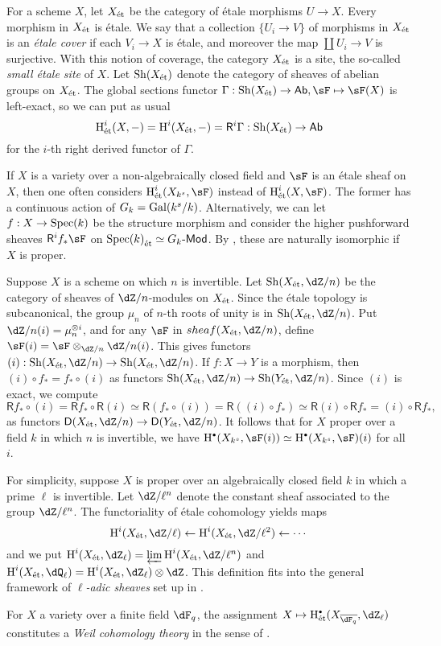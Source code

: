 \documentclass{article}
\begin{document}
For a scheme $X$, let ${X}_\textnormal{\'et}$ be the category of \'etale morphisms 
$U\to X$. Every morphism in ${X}_\textnormal{\'et}$ is \'etale. We say that a collection 
$\{U_i\to V\}$ of morphisms in ${X}_\textnormal{\'et}$ is an \emph{\'etale cover} if each 
$V_i \to X$ is \'etale, and moreover the map $\coprod U_i \to V$ is surjective. 
With this notion of coverage, the category ${X}_\textnormal{\'et}$ is a site, the so-called 
\emph{small \'etale site} of $X$. Let $\operatorname{Sh}({X}_\textnormal{\'et})$ denote the category of 
sheaves of abelian groups on ${X}_\textnormal{\'et}$. The global sections functor 
$\Gamma:\sheaf(\et X) \to \mathsf{Ab},\sF\mapsto \sF(X)$ is left-exact, so we 
can put as usual 
\[
  \operatorname{H}_\text{\'et}^i(X,-) = \operatorname{H}^i({X}_\textnormal{\'et},-) = \mathsf R^i \Gamma :\operatorname{Sh}({X}_\textnormal{\'et}) \to \mathsf{Ab}
\]
for the $i$-th right derived functor of $\Gamma$. 

If $X$ is a variety over a non-algebraically closed field and $\sF$ is an 
\'etale sheaf on $X$, then one often considers 
$\h_\text{\'et}^i(X_{k^s},\sF)$ instead of $\h_\text{\'et}^i(X,\sF)$. The 
former has a continuous action of $G_k=\operatorname{Gal}(k^s/k)$. Alternatively, we can 
let $f:X\to \operatorname{Spec}(k)$ be the structure morphism and consider the higher 
pushforward sheaves $\mathsf R^i f_\ast \sF$ on 
${\operatorname{Spec}(k)}_\textnormal{\'et}\simeq G_k\text{-}\mathsf{Mod}$. By \cite[I 4.1.1]{de77}, these 
are naturally isomorphic if $X$ is proper. 

Suppose $X$ is a scheme on which $n$ is invertible. Let $\sheaf(\et X,\dZ/n)$ 
be the category of sheaves of $\dZ/n$-modules on ${X}_\textnormal{\'et}$. Since the \'etale 
topology is subcanonical, the group $\mu_n$ of $n$-th roots of unity is in 
$\sheaf(\et X,\dZ/n)$. Put $\dZ/n(i) = \mu_n^{\otimes i}$, and for any $\sF$ in 
$sheaf(\et X,\dZ/n)$, define $\sF(i) = \sF\otimes_{\dZ/n}\dZ/n(i)$. This gives 
functors $(i):\sheaf(\et X,\dZ/n) \to \sheaf(\et X,\dZ/n)$. If $f:X\to Y$ is a 
morphism, then $(i)\circ f_\ast=f_\ast\circ (i)$ as functors 
$\sheaf(\et X,\dZ/n) \to \sheaf(\et Y,\dZ/n)$. Since $(i)$ is exact, we compute  
\[
  \mathsf R f_\ast \circ (i) = \mathsf R f_\ast \circ \mathsf R (i) \simeq \mathsf R(f_\ast \circ(i)) = \mathsf R((i)\circ f_\ast)\simeq  \mathsf R(i)\circ \mathsf R f_\ast = (i)\circ \mathsf R f_\ast \text{,}
\]
as functors $\mathsf D(\et X,\dZ/n) \to \mathsf D(\et Y,\dZ/n)$. It follows 
that for $X$ proper over a field $k$ in which $n$ is invertible, we have 
$\h^\bullet(X_{k^s},\sF(i)) \simeq \h^\bullet(X_{k^s},\sF)(i)$ for all $i$. 

For simplicity, suppose $X$ is proper over an algebraically closed field $k$ in 
which a prime $\ell$ is invertible. Let $\dZ/\ell^n$ denote the constant sheaf 
associated to the group $\dZ/\ell^n$. The functoriality of \'etale cohomology 
yields maps 
\[
  \h^i(\et X,\dZ/\ell) \leftarrow \h^i(\et X,\dZ/\ell^2) \leftarrow \cdots 
\]
and we put $\h^i(\et X,\dZ_\ell) = \varprojlim \h^i(\et X,\dZ/\ell^n)$ and 
$\h^i(\et X,\dQ_\ell) = \h^i(\et X,\dZ_\ell)\otimes \dZ$. This definition fits 
into the general framework of \emph{$\ell$-adic sheaves} set up in \cite{de80}. 

For $X$ a variety over a finite field $\dF_q$, the assignment  
$X\mapsto \h_\text{\'et}^\bullet(X_{\overline{\dF_q}},\dZ_\ell)$ constitutes a 
\emph{Weil cohomology theory} in the sense of \cite[3.3]{an04}. 












\end{document}
